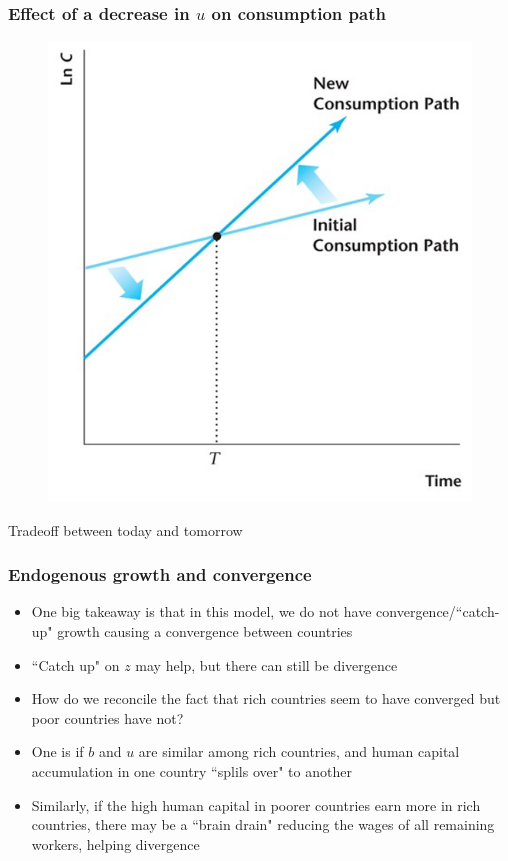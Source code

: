 \documentclass{beamer}
\begin{document}
\begin{frame}
\frametitle[alignment=center]{Effect of a decrease in $u$ on consumption path}
\begin{figure}
\centering
\includegraphics[scale=0.5]{Figures/W_Fig_8pt7.png}
\end{figure}
Tradeoff between today and tomorrow
\end{frame}


\begin{frame}
\frametitle[alignment=center]{Endogenous growth and convergence}
\begin{itemize}
\item One big takeaway is that in this model, we do not have convergence/``catch-up" growth causing a convergence between countries
\bigskip
\item ``Catch up" on $z$ may help, but there can still be divergence
\bigskip
\item How do we reconcile the fact that rich countries seem to have converged but poor countries have not?
\bigskip
\item One is if $b$ and $u$ are similar among rich countries, and human capital accumulation in one country ``splils over" to another
\bigskip
\item Similarly, if the high human capital in poorer countries earn more in rich countries, there may be a ``brain drain" reducing the wages of all remaining workers, helping divergence
\end{itemize}
\end{frame}
\end{document}
